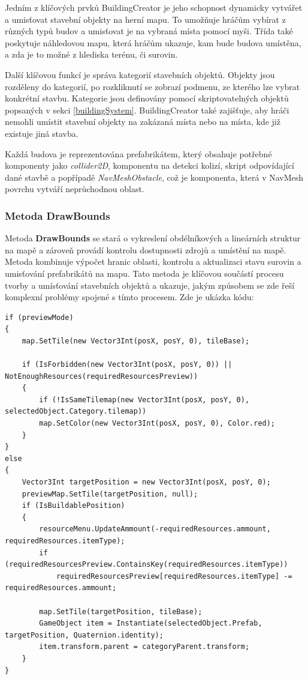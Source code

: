 Jedním z klíčových prvků BuildingCreator je jeho schopnost dynamicky vytvářet a umisťovat stavební objekty na herní mapu. To umožňuje hráčům vybírat z různých typů budov a umisťovat je na vybraná místa pomocí myši. Třída také poskytuje náhledovou mapu, která hráčům ukazuje, kam bude budova umístěna, a zda je to možné z hlediska terénu, či surovin.

Další klíčovou funkcí je správa kategorií stavebních objektů. Objekty jsou rozděleny do kategorií, po rozkliknutí se zobrazí podmenu, ze kterého lze vybrat konkrétní stavbu. Kategorie jsou definovány pomocí skriptovatelných objektů popsaných v sekci \ref{buildingSystem}. BuildingCreator také zajišťuje, aby hráči nemohli umístit stavební objekty na zakázaná místa nebo na místa, kde již existuje jiná stavba. 

Každá budova je reprezentována prefabrikátem, který obsahuje potřebné komponenty jako \textit{collider2D}, komponentu na detekci kolizí, skript odpovídající dané stavbě a popřípadě \textit{NavMeshObstacle}, což je komponenta, která v NavMesh povrchu vytváří neprůchodnou oblast.

\subsubsection{Metoda DrawBounds}
Metoda \textbf{DrawBounds} se stará o vykreslení obdélníkových a lineárních struktur na mapě a zároveň provádí kontrolu dostupnosti zdrojů a umístění na mapě. Metoda kombinuje výpočet hranic oblasti, kontrolu a aktualizaci stavu surovin a umisťování prefabrikátů na mapu. Tato metoda je klíčovou součástí procesu tvorby a umísťování stavebních objektů a ukazuje, jakým způsobem se zde řeší komplexní problémy spojené s tímto procesem. Zde je ukázka kódu:

\begin{lstlisting}
if (previewMode)
{
	map.SetTile(new Vector3Int(posX, posY, 0), tileBase);
	
	if (IsForbidden(new Vector3Int(posX, posY, 0)) || NotEnoughResources(requiredResourcesPreview))
	{
		if (!IsSameTilemap(new Vector3Int(posX, posY, 0), selectedObject.Category.tilemap))
		map.SetColor(new Vector3Int(posX, posY, 0), Color.red);
	}
}
else
{
	Vector3Int targetPosition = new Vector3Int(posX, posY, 0);
	previewMap.SetTile(targetPosition, null);	
	if (IsBuildablePosition)
	{
		resourceMenu.UpdateAmmount(-requiredResources.ammount, requiredResources.itemType);
		if (requiredResourcesPreview.ContainsKey(requiredResources.itemType))
			requiredResourcesPreview[requiredResources.itemType] -= requiredResources.ammount;
		
		map.SetTile(targetPosition, tileBase);
		GameObject item = Instantiate(selectedObject.Prefab, targetPosition, Quaternion.identity);
		item.transform.parent = categoryParent.transform;
	}
}
\end{lstlisting}

